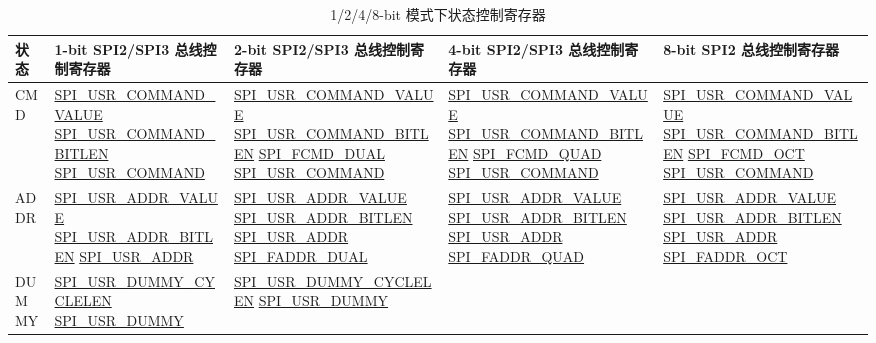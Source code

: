 \documentclass[main\_\_CN.tex]{subfiles}
\begin{document}
\begin{landscape}
\begin{longtable}[c]{ |L{1.3cm}|L{5.2cm}|L{5.2cm}|L{5.2cm}|L{5.2cm}| }
\caption{1/2/4/8-bit 模式下状态控制寄存器}
\\\hline
{}      
\textbf{状态} & \textbf{ 1-bit SPI2/SPI3 总线控制寄存器 } & \textbf{ 2-bit SPI2/SPI3 总线控制寄存器} & \textbf{ 4-bit SPI2/SPI3 总线控制寄存器} & \textbf{ 8-bit SPI2 总线控制寄存器}\\
     \hline
\endhead
\label{tab:spi-usr1}
CMD  &\hyperref[fielddesc:SPIUSRCOMMANDVALUE]{SPI\_USR\_COMMAND\_VALUE} 
 \hyperref[fielddesc:SPIUSRCOMMANDBITLEN]{SPI\_USR\_COMMAND\_BITLEN} \hyperref[fielddesc:SPIUSRCOMMAND]{SPI\_USR\_COMMAND}
     &\hyperref[fielddesc:SPIUSRCOMMANDVALUE]{SPI\_USR\_COMMAND\_VALUE} \hyperref[fielddesc:SPIUSRCOMMANDBITLEN]{SPI\_USR\_COMMAND\_BITLEN} \hyperref[fielddesc:SPIFCMDDUAL]{SPI\_FCMD\_DUAL} \hyperref[fielddesc:SPIUSRCOMMAND]{SPI\_USR\_COMMAND} & \hyperref[fielddesc:SPIUSRCOMMANDVALUE]{SPI\_USR\_COMMAND\_VALUE} \hyperref[fielddesc:SPIUSRCOMMANDBITLEN]{SPI\_USR\_COMMAND\_BITLEN} \hyperref[fielddesc:SPIFCMDQUAD]{SPI\_FCMD\_QUAD} \hyperref[fielddesc:SPIUSRCOMMAND]{SPI\_USR\_COMMAND} & \hyperref[fielddesc:SPIUSRCOMMANDVALUE]{SPI\_USR\_COMMAND\_VALUE}  
 \hyperref[fielddesc:SPIUSRCOMMANDBITLEN]{SPI\_USR\_COMMAND\_BITLEN} \hyperref[fielddesc:SPIFCMDOCT]{SPI\_FCMD\_OCT} \hyperref[fielddesc:SPIUSRCOMMAND]{SPI\_USR\_COMMAND}\\
     \hline
ADDR &\hyperref[fielddesc:SPIUSRADDRVALUE]{SPI\_USR\_ADDR\_VALUE}           
 \hyperref[fielddesc:SPIUSRADDRBITLEN]{SPI\_USR\_ADDR\_BITLEN} \hyperref[fielddesc:SPIUSRADDR]{SPI\_USR\_ADDR}
     &\hyperref[fielddesc:SPIUSRADDRVALUE]{SPI\_USR\_ADDR\_VALUE} \hyperref[fielddesc:SPIUSRADDRBITLEN]{SPI\_USR\_ADDR\_BITLEN} \hyperref[fielddesc:SPIUSRADDR]{SPI\_USR\_ADDR} \hyperref[fielddesc:SPIFADDRDUAL]{SPI\_FADDR\_DUAL} & 
 \hyperref[fielddesc:SPIUSRADDRVALUE]{SPI\_USR\_ADDR\_VALUE} \hyperref[fielddesc:SPIUSRADDRBITLEN]{SPI\_USR\_ADDR\_BITLEN} \hyperref[fielddesc:SPIUSRADDR]{SPI\_USR\_ADDR}        \hyperref[fielddesc:SPIFADDRQUAD]{SPI\_FADDR\_QUAD} & \hyperref[fielddesc:SPIUSRADDRVALUE]{SPI\_USR\_ADDR\_VALUE}  
 \hyperref[fielddesc:SPIUSRADDRBITLEN]{SPI\_USR\_ADDR\_BITLEN} \hyperref[fielddesc:SPIUSRADDR]{SPI\_USR\_ADDR} \hyperref[fielddesc:SPIFADDROCT]{SPI\_FADDR\_OCT} \\
     \hline
DUMMY&\hyperref[fielddesc:SPIUSRDUMMYCYCLELEN]{SPI\_USR\_DUMMY\_CYCLELEN}     
 \hyperref[fielddesc:SPIUSRDUMMY]{SPI\_USR\_DUMMY} 
     &\hyperref[fielddesc:SPIUSRDUMMYCYCLELEN]{SPI\_USR\_DUMMY\_CYCLELEN} \hyperref[fielddesc:SPIUSRDUMMY]{SPI\_USR\_DUMMY} & 

\end{longtable}
\end{landscape}
\end{document}
